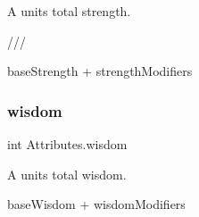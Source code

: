 A unit\textquotesingle{}s total strength. 

/// 

base\+Strength + strength\+Modifiers\mbox{\label{class_attributes_a48ec0beacd46bb9b9e206becde146d69}} 
\subsubsection{\texorpdfstring{wisdom}{wisdom}}
{\footnotesize\ttfamily int Attributes.\+wisdom\hspace{0.3cm}{\ttfamily [get]}}



A unit\textquotesingle{}s total wisdom. 

base\+Wisdom + wisdom\+Modifiers